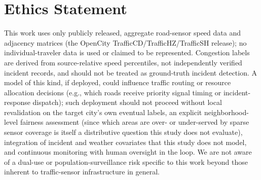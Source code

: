 \section*{Ethics Statement}

This work uses only publicly released, aggregate road-sensor speed data and adjacency matrices
(the OpenCity TrafficCD/TrafficHZ/TrafficSH release); no individual-traveler data is used or
claimed to be represented. Congestion labels are derived from source-relative speed percentiles,
not independently verified incident records, and should not be treated as ground-truth incident
detection. A model of this kind, if deployed, could influence traffic routing or resource
allocation decisions (e.g., which roads receive priority signal timing or incident-response
dispatch); such deployment should not proceed without local revalidation on the target city's own
eventual labels, an explicit neighborhood-level fairness assessment (since which areas are
over- or under-served by sparse sensor coverage is itself a distributive question this study does
not evaluate), integration of incident and weather covariates that this study does not model, and
continuous monitoring with human oversight in the loop. We are not aware of a dual-use or
population-surveillance risk specific to this work beyond those inherent to traffic-sensor
infrastructure in general.
